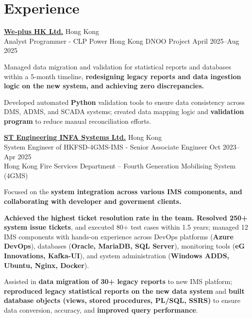 \section{Experience}
\begin{entrylist}

    \item \textbf{\href{https://www.we-plus.asia/}{We-plus HK Ltd.}} \hfill Hong Kong\\
    Analyst Programmer - CLP Power Hong Kong DNOO Project \hfill April 2025--Aug 2025\\

    \begin{detaillist}
    \item Managed data migration and validation for statistical reports and databases within a 5-month timeline, \textbf{redesigning legacy reports and data ingestion logic on the new system, and achieving zero discrepancies.}
    \item Developed automated \textbf{Python} validation tools to ensure data consistency across DMS, ADMS, and SCADA systems; created data mapping logic and \textbf{validation program} to reduce manual reconciliation efforts.
    \end{detaillist}

    \item \textbf{\href{https://www.infa.com/}{ST Engineering INFA Systems Ltd.}} \hfill Hong Kong\\
    System Engineer of HKFSD-4GMS-IMS - Senior Associate Engineer \hfill Oct 2023--Apr 2025\\
    Hong Kong Fire Services Department – Fourth Generation Mobilising System (4GMS)\\

    \begin{detaillist}
        \item Focused on the \textbf{system integration across various IMS components, and collaborating with developer and goverment clients.}
        \item \textbf{Achieved the highest ticket resolution rate in the team. Resolved 250+ system issue tickets}, and executed 80+ test cases within 1.5 years; managed 12 IMS components with hands-on experience across DevOps platforms (\textbf{Azure DevOps}), databases (\textbf{Oracle, MariaDB, SQL Server}), monitoring tools (\textbf{eG Innovations, Kafka-UI}), and system administration (\textbf{Windows ADDS, Ubuntu, Nginx, Docker}).
        \item Assisted in \textbf{data migration of 30+ legacy reports} to new IMS platform; \textbf{reproduced legacy statistical reports on the new data system} and \textbf{built database objects (views, stored procedures, PL/SQL, SSRS)} to ensure data conversion, accuracy, and \textbf{improved query performance}.
    \end{detaillist}


\end{entrylist}
